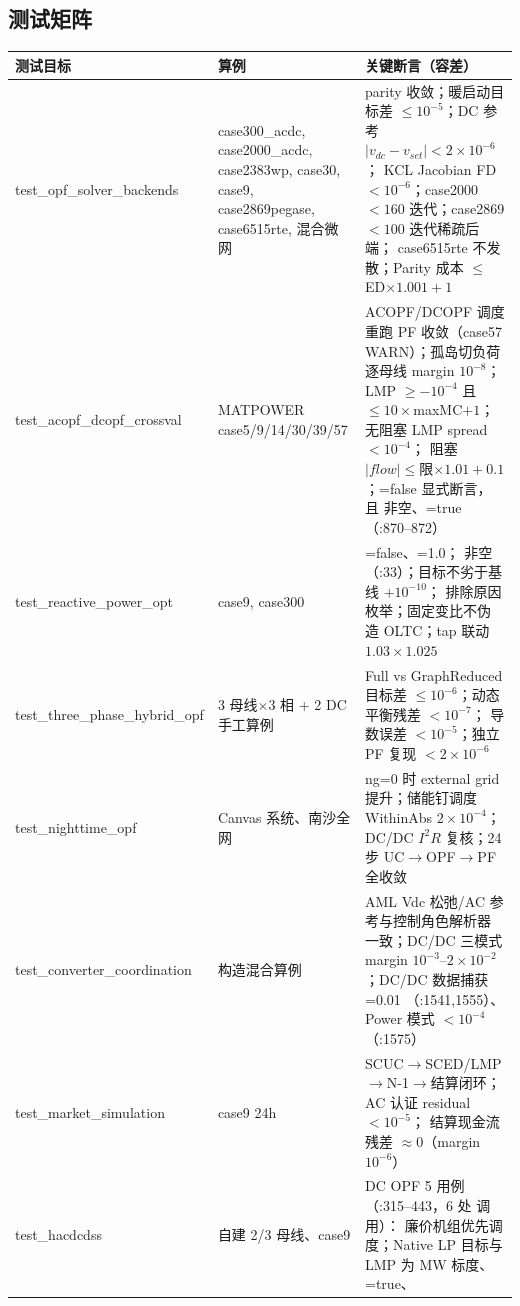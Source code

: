 \subsection{测试矩阵}
\begin{footnotesize}
\begin{longtable}{@{}L{4.2cm}L{3.6cm}L{6.6cm}@{}}
\toprule
测试目标 & 算例 & 关键断言（容差）\\
\midrule
\endhead
test\_opf\_solver\_backends & case300\_acdc, case2000\_acdc, case2383wp, case30,
  case9, case2869pegase, case6515rte, 混合微网 &
  parity 收敛；暖启动目标差 $\le10^{-5}$；DC 参考 $|v_{dc}-v_{set}|<2\times10^{-6}$；
  KCL Jacobian FD $<10^{-6}$；case2000 $<160$ 迭代；case2869 $<100$ 迭代稀疏后端；
  case6515rte 不发散；Parity 成本 $\le$ ED$\times1.001+1$\\
test\_acopf\_dcopf\_crossval & MATPOWER case5/9/14/30/39/57 &
  ACOPF/DCOPF 调度重跑 PF 收敛（case57 WARN）；孤岛切负荷逐母线 margin $10^{-8}$；
  LMP $\ge-10^{-4}$ 且 $\le10\times$maxMC$+1$；无阻塞 LMP spread $<10^{-4}$；
  阻塞 $|flow|\le$限$\times1.01+0.1$；=false 显式断言，
  且  非空、=true
  （:870--872）\\
test\_reactive\_power\_opt & case9, case300 &
  =false、=1.0； 非空
  （:33）；目标不劣于基线 $+10^{-10}$；
  排除原因枚举；固定变比不伪造 OLTC；tap 联动 $1.03\times1.025$\\
test\_three\_phase\_hybrid\_opf & 3 母线$\times$3 相 + 2 DC 手工算例 &
  Full vs GraphReduced 目标差 $\le10^{-6}$；动态平衡残差 $<10^{-7}$；
  导数误差 $<10^{-5}$；独立 PF 复现 $<2\times10^{-6}$\\
test\_nighttime\_opf & Canvas 系统、南沙全网 &
  ng=0 时 external grid 提升；储能钉调度 WithinAbs $2\times10^{-4}$；
  DC/DC $I^2R$ 复核；24 步 UC$\to$OPF$\to$PF 全收敛\\
test\_converter\_coordination & 构造混合算例 &
  AML Vdc 松弛/AC 参考与控制角色解析器一致；DC/DC 三模式
  margin $10^{-3}$--$2\times10^{-2}$；DC/DC 数据捕获 =0.01
  （:1541,1555）、Power 模式 $<10^{-4}$（:1575）\\
test\_market\_simulation & case9 24h &
  SCUC$\to$SCED/LMP$\to$N-1$\to$结算闭环；AC 认证 residual $<10^{-5}$；
  结算现金流残差 $\approx0$（margin $10^{-6}$）\\
test\_hacdcdss & 自建 2/3 母线、case9 &
  DC OPF 5 用例（:315--443，6 处  调用）：
  廉价机组优先调度；Native LP 目标与 LMP 为 MW 标度、=true、

\end{longtable}
\end{footnotesize}
